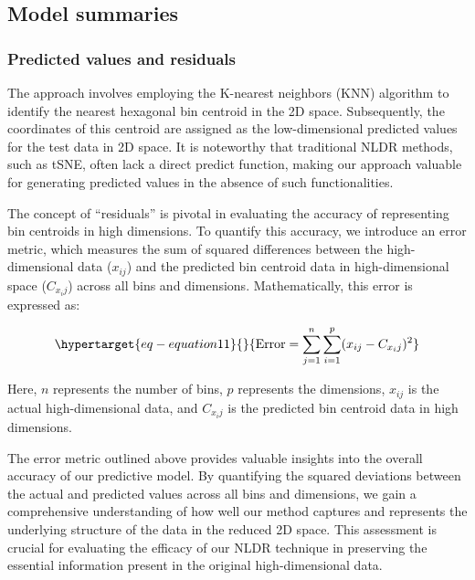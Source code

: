 \documentclass[
  12pt]{article}
\begin{document}
\hypertarget{sec-summary}{%
\subsection{Model summaries}\label{sec-summary}}

\hypertarget{predicted-values-and-residuals}{%
\subsubsection{Predicted values and
residuals}\label{predicted-values-and-residuals}}

The approach involves employing the K-nearest neighbors (KNN) algorithm
to identify the nearest hexagonal bin centroid in the 2D space.
Subsequently, the coordinates of this centroid are assigned as the
low-dimensional predicted values for the test data in 2D space. It is
noteworthy that traditional NLDR methods, such as tSNE, often lack a
direct predict function, making our approach valuable for generating
predicted values in the absence of such functionalities.

The concept of ``residuals'' is pivotal in evaluating the accuracy of
representing bin centroids in high dimensions. To quantify this
accuracy, we introduce an error metric, which measures the sum of
squared differences between the high-dimensional data (\(x_{ij}\)) and
the predicted bin centroid data in high-dimensional space (\(C_{x_ij}\))
across all bins and dimensions. Mathematically, this error is expressed
as:

\begin{equation}\protect\hypertarget{eq-equation11}{}{
\text{Error} = \sum_{j = 1}^{n}\sum_{i = 1}^{p} (x_{ij} - C_{x_ij})^2
}\label{eq-equation11}\end{equation}

Here, \(n\) represents the number of bins, \(p\) represents the
dimensions, \(x_{ij}\) is the actual high-dimensional data, and
\(C_{x_ij}\) is the predicted bin centroid data in high dimensions.

The error metric outlined above provides valuable insights into the
overall accuracy of our predictive model. By quantifying the squared
deviations between the actual and predicted values across all bins and
dimensions, we gain a comprehensive understanding of how well our method
captures and represents the underlying structure of the data in the
reduced 2D space. This assessment is crucial for evaluating the efficacy
of our NLDR technique in preserving the essential information present in
the original high-dimensional data.
\end{document}
